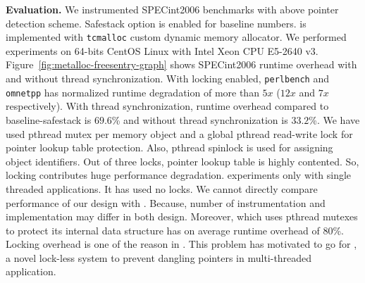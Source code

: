 \textbf{Evaluation.} We instrumented SPECint2006 benchmarks with above pointer detection scheme. Safestack option is enabled for baseline numbers. \metalloc{} is implemented with \texttt{tcmalloc} custom dynamic memory allocator. We performed experiments on 64-bits CentOS Linux with Intel Xeon CPU E5-2640 v3. Figure~\ref{fig:metalloc-freesentry-graph} shows SPECint2006 runtime overhead with and without thread synchronization. With locking enabled, \texttt{perlbench} and \texttt{omnetpp} has normalized runtime degradation of more than $5x$ ($12x$ and $7x$ respectively). With thread synchronization, runtime overhead compared to baseline-safestack is $69.6$\% and without thread synchronization is $33.2$\%. We have used pthread mutex per memory object and a global pthread read-write lock for pointer lookup table protection. Also, pthread spinlock is used for assigning object identifiers. Out of three locks, pointer lookup table is highly contented. So, locking contributes huge performance degradation. \freesentry{} experiments only with single threaded applications. It has used no locks. We cannot directly compare performance of our design with \freesentry{}. Because, number of instrumentation and implementation may differ in both design. Moreover, \dangnull{} which uses pthread mutexes to protect its internal data structure has on average runtime overhead of $80$\%. Locking overhead is one of the reason in \dangnull{}. This problem has motivated to go for \projectname{}, a novel lock-less system to prevent dangling pointers in multi-threaded application.
